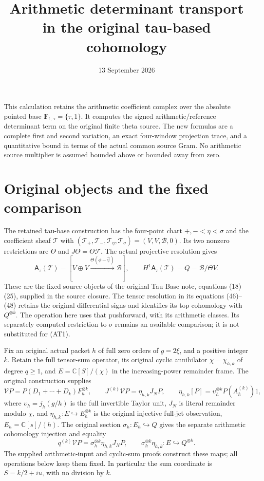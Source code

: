 \documentclass[11pt]{article}
\title{Arithmetic determinant transport in the original tau-based cohomology}
\author{}
\date{13 September 2026}
\newcommand{\C}{\mathbb C}
\begin{document}
\maketitle

This calculation retains the arithmetic coefficient complex over the
absolute pointed base $\mathbf F_{1,\tau}=\{\tau,1\}$. It computes the
signed arithmetic/reference determinant term on the original finite
theta source. The new formulas are a complete first and second variation,
an exact four-window projection trace, and a quantitative bound in terms
of the actual common source Gram. No arithmetic source multiplier is
assumed bounded above or bounded away from zero.

\section{Original objects and the fixed comparison}

The retained tau-base construction has the four-point chart
$+,-<\eta<\sigma$ and the coefficient sheaf $\mathcal T$ with
$(\mathcal T_+,\mathcal T_-,\mathcal T_\eta,\mathcal T_\sigma)
=(V,V,\mathscr B,0)$. Its two nonzero restrictions are $\Theta$ and
$J\Theta=\Theta\mathcal F$. The actual projective resolution gives
\[
 \mathsf A_\tau(\mathcal T)
 =[V\oplus V\xrightarrow{\Theta(\phi-\widehat\psi)}\mathscr B],
 \qquad H^1\mathsf A_\tau(\mathcal T)=Q=\mathscr B/\Theta V.
 \tag{AT1}
\]
These are the fixed source objects of the original Tau Base note,
equations (18)--(25), supplied in the source closure. The tensor
resolution in its equations (46)--(48) retains the original differential
signs and identifies its top cohomology with $Q^{\otimes k}$.
The operation here uses that pushforward, with its arithmetic classes.
Its separately computed restriction to $\sigma$ remains an available
comparison; it is not substituted for (AT1).

Fix an original actual packet $h$ of full zero orders of $g=2\xi$,
and a positive integer $k$. Retain the full tensor-sum operator,
its original cyclic annihilator $\chi=\chi_{h,k}$ of degree $q\ge1$,
and $E=\C[S]/(\chi)$ in the increasing-power remainder frame.
The original construction supplies
\[
 \mathcal V P=P(D_1+\cdots+D_k)F_h^{\otimes k},\qquad
 J^{(k)}\mathcal V P=\eta_{h,k}J_NP,\qquad
 \eta_{h,k}[P]=\upsilon_h^{\otimes k}P(A_h^{(k)})1,
 \tag{AT2}
\]
where $\upsilon_h=j_h(g/h)$ is the full invertible Taylor unit,
$J_N$ is literal remainder modulo $\chi$, and
$\eta_{h,k}:E\hookrightarrow E_h^{\otimes k}$ is the original
injective full-jet observation, $E_h=\C[s]/(h)$.
The original section $\sigma_h:E_h\hookrightarrow Q$ gives the
separate arithmetic cohomology injection and equality
\[
 q^{(k)}\mathcal V P=\sigma_h^{\otimes k}\eta_{h,k}J_NP,
 \qquad \sigma_h^{\otimes k}\eta_{h,k}:E\hookrightarrow Q^{\otimes k}.
 \tag{AT2a}
\]
The supplied arithmetic-input and cyclic-sum proofs construct these
maps; all operations below keep them fixed. In
particular the sum coordinate is $S=k/2+iu$, with no division by $k$.
\end{document}
